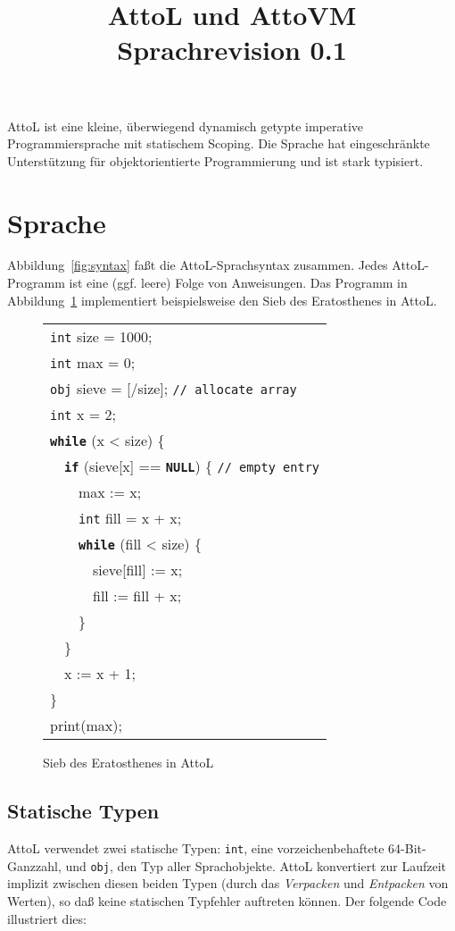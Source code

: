\documentclass[11pt,a4paper]{article}
\title{AttoL und AttoVM\\ \small{Sprachrevision 0.1}}
\newenvironment{slisting}{%
        \begin{tt}%
        \begin{tabular}{l}%
        }
        {%
        \end{tabular}%
        \end{tt}%
        }
\newcommand{\Cty}[1]{\textcolor{dblue}{\texttt{#1}}}
\newcommand{\Ccom}[1]{\textcolor{dgreen}{\texttt{#1}}}
\newcommand{\Ckw}[1]{\textbf{\texttt{#1}}}
\begin{document}
\maketitle

AttoL ist eine kleine, überwiegend dynamisch getypte imperative
Programmiersprache mit statischem Scoping.  Die Sprache hat
eingeschränkte Unterstützung für objektorientierte Programmierung und ist
stark typisiert.

\section{Sprache}

Abbildung~\ref{fig:syntax} faßt die AttoL-Sprachsyntax zusammen.  Jedes
AttoL-Programm ist eine (ggf. leere) Folge von Anweisungen. 
Das Programm in Abbildung~\ref{fig:sieve} implementiert beispielsweise den
Sieb des Eratosthenes in AttoL.

\begin{figure}
\begin{slisting}
\Cty{int} size = 1000;\\
\Cty{int} max = 0;\\
\Cty{obj} sieve = [/size]; \Ccom{// allocate array}\\
\Cty{int} x = 2; \\
\Ckw{while} (x < size) \{ \\
\ \     \Ckw{if} (sieve[x] == \Ckw{NULL}) \{ \Ccom{// empty entry}\\
\ \ \ \        max := x; \\
\ \ \ \	\Cty{int} fill = x + x;\\
\ \ \ \         \Ckw{while} (fill < size) \{\\
\ \ \ \ \ \             sieve[fill] := x;\\
\ \ \ \ \ \             fill := fill + x;\\
\ \ \ \         \}\\
\ \     \}\\
\ \     x := x + 1;\\
\}\\
print(max);
\end{slisting}
\caption{Sieb des Eratosthenes in AttoL}\label{fig:sieve}
\end{figure}

\subsection{Statische Typen}\label{sec:types}
AttoL verwendet zwei statische Typen: \Cty{int}, eine vorzeichenbehaftete 64-Bit-Ganzzahl,
und \Cty{obj}, den Typ aller Sprachobjekte.
AttoL konvertiert zur Laufzeit implizit zwischen diesen beiden Typen (durch das \emph{Verpacken} und \emph{Entpacken} von Werten), so daß keine
statischen Typfehler auftreten können.
Der folgende Code illustriert dies:
\end{document}
